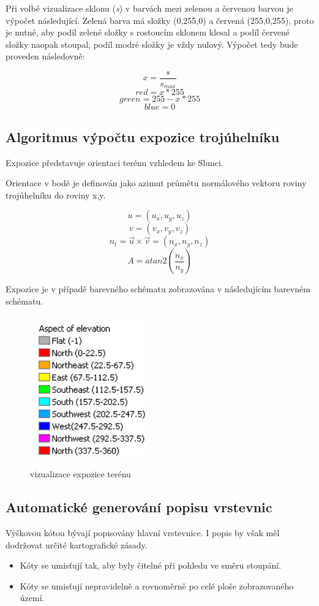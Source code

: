 \documentclass[11pt]{article}
\begin{document}
Při volbě vizualizace sklonu (\textit{s}) v barvách mezi zelenou a červenou barvou je výpočet následující. Zelená barva má složky (0,255,0) a červená (255,0,255), proto je nutné, aby podíl zelené složky s rostoucím sklonem klesal a podíl červené složky naopak stoupal, podíl modré složky je vždy nulový. Výpočet tedy bude proveden následovně:

$$	x = \frac{s}{s_{max}} $$
$$	red = x*255 $$
$$	green = 255-x*255 $$
$$	blue = 0 $$

\subsection{Algoritmus výpočtu expozice trojúhelníku}
Expozice představuje orientaci terénu vzhledem ke Slunci.

Orientace v bodě je definován jako azimut průmětu normálového vektoru roviny trojúhelníku do roviny x,y.

$$  u = (u_x, u_y, u_z)$$
$$  v = (v_x, v_y, v_z)$$
$$ n_t = \vec{u}\times \vec{v} = (n_x, n_y, n_z)$$
$$ A =atan2( \frac{n_x}{n_y}) $$

Expozice je v případě barevného schématu zobrazována v následujícím barevném schématu.

\begin{figure}[htbh]
	\centering
	\includegraphics[scale=1]{images/expozice.jpg} 
	\caption{vizualizace expozice terénu}
	\label{fig:getExposition()}
\end{figure} 

\subsection{Automatické generování popisu vrstevnic}
Výškovou kótou bývají popisovány hlavní vrstevnice. I popis by však měl dodržovat určité kartografické zásady.
\begin{itemize}
\item Kóty se umisťují tak, aby byly čitelné při pohledu ve směru stoupání.
\item Kóty se umisťují nepravidelně a rovnoměrně po celé ploše zobrazovaného území.
\end{itemize}
\end{document}
